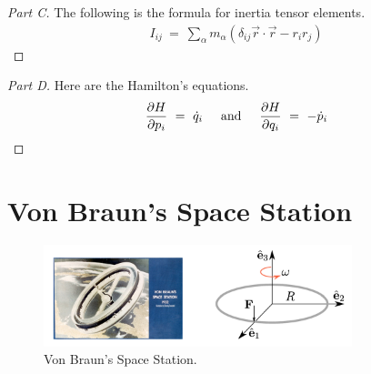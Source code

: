 \documentclass{article}
\numberwithin{equation}{section}
\newcommand{\textAnd}{
    {
        \hspace{5mm}
        \textrm{and}
        \hspace{5mm}
    }
}
\newcommand{\pderiv}[2]{
\frac {\partial {#1} } {\partial {#2}}
}
\begin{document}
\begin{proof}[Part C] The following is the formula for 
    inertia tensor elements. 
    \begin{align}
        I_{ij} \ = \ \sum_\alpha m_\alpha\left( \delta_{ij}\vec r \cdot \vec r - r_i r_j\right)
    \end{align}
\end{proof}

\begin{proof}[Part D] Here are the Hamilton's equations. 
\begin{align}
    \pderiv{H}{p_i} \ = \ \dot q_i \textAnd
    \pderiv{H}{q_i} \ = \ - \dot p_i
\end{align}
    
\end{proof}

\section{Von Braun's Space Station}

\begin{figure}[htp]
    \centering
    \includegraphics[width=0.8\textwidth]{Q2_fig.png} %
    \caption{Von Braun's Space Station.}
    \label{fig:example}
\end{figure}
\end{document}
